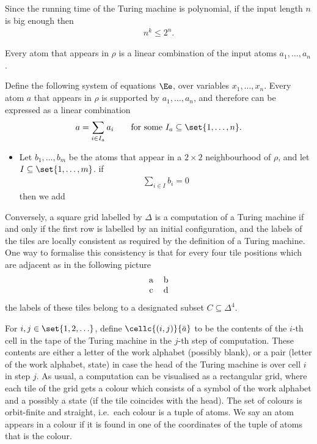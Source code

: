 Since the running time of the Turing machine is polynomial, if the input length $n$ is big enough then 
\begin{align*}
	n^k \le 2^n.
\end{align*}


\begin{claim}
	Every atom that appears in $\rho$ is a linear combination of the input atoms $a_1,\ldots,a_n$. 
\end{claim}


Define the following system of equations $\Ee$, over variables $x_1,\ldots,x_n$. Every atom $a$ that appears in $\rho$ is supported by $a_1,\ldots,a_n$, and therefore can be expressed as a linear combination
\begin{align*}
	a = \sum_{i \in I_a} a_i \qquad \text{for some $I_a \subseteq \set{1,\ldots,n}$}.
\end{align*}
\begin{itemize}
	\item Let $b_1,\ldots,b_m$ be the atoms that appear in a $2 \times 2$ neighbourhood of $\rho$, and let $I \subseteq \set{1,\ldots,m}$. if
	\begin{align*}
		\sum_{i \in I} b_i = 0
	\end{align*}
	then we add 
\end{itemize}
Conversely, a square grid labelled by $\Delta$ is a computation of a Turing machine if and only if the first row is labelled by an initial configuration, and the labels of the tiles are locally consistent as required by the definition of a Turing machine. One way to formalise this consistency is that for every four tile positions which are adjacent as in the following picture
\begin{align*}
	\begin{tabular}{cc}
		a & b \\
		c & d
	\end{tabular}
\end{align*}
the labels of these tiles belong to a designated subset $C \subseteq \Delta^4$. 



For $i,j \in \set{1,2,\ldots}$, define $\cellc {(i,j)} {\bar a}$
to be the contents of the $i$-th cell in the tape of the Turing machine in the $j$-th step of computation. These contents are either a letter of the work alphabet (possibly blank), or a pair (letter of the work alphabet, state) in case the head of the Turing machine is over cell $i$ in step $j$. 
As usual, a computation can be visualised as a rectangular grid, where each tile of the grid gets a colour which consists of a symbol of the work alphabet and a possibly a state (if the tile coincides with the head). The set of colours is orbit-finite and straight, i.e.~each colour is a tuple of atoms. We say an atom appears in a colour if it is found in one of the coordinates of the tuple of atoms that is the colour.


